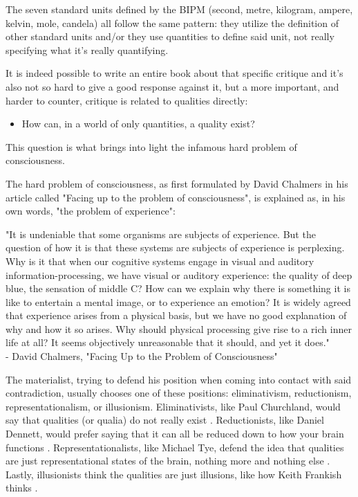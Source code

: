 The seven standard units defined by the BIPM (second, metre, kilogram, ampere, kelvin, mole,
candela) all follow the same pattern: they utilize the definition of other standard units
and/or they use quantities to define said unit, not really specifying what it's really
quantifying.

It is indeed possible to write an entire book about that specific critique and it's also not
so hard to give a good response against it, but a more important, and harder to counter,
critique is related to qualities directly:

\begin{itemize}
    \item How can, in a world of only quantities, a quality exist?
\end{itemize}

This question is what brings into light the infamous hard problem of
consciousness.

The hard problem of consciousness, as first formulated by David Chalmers in his article
called "Facing up to the problem of consciousness", is explained as, in his own words,
"the problem of experience":

\begin{center}
    \itshape
    \parbox{0.7\textwidth}{
    "It is undeniable that some organisms are subjects of experience. But the question of how
    it is that these systems are subjects of experience is perplexing. Why is it that when our
    cognitive systems engage in visual and auditory information-processing, we have visual or
    auditory experience: the quality of deep blue, the sensation of middle C? How can we explain
    why there is something it is like to entertain a mental image, or to experience an emotion? It
    is widely agreed that experience arises from a physical basis, but we have no good
    explanation of why and how it so arises. Why should physical processing give rise to a rich
    inner life at all? It seems objectively unreasonable that it should, and yet it does."\\
    \normalfont - David Chalmers, "Facing Up to the Problem of Consciousness" \cite{Chalmers1995}
    }
\end{center}

The materialist, trying to defend his position when coming into contact with said contradiction,
usually chooses one of these positions: eliminativism, reductionism, representationalism, or
illusionism. Eliminativists, like Paul Churchland, would say that qualities (or qualia) do not
really exist \cite{Churchland1981}. Reductionists, like Daniel Dennett, would prefer saying that
it can all be reduced down to how your brain functions \cite{Dennett1991}. Representationalists,
like Michael Tye, defend the idea that qualities are just representational states of the brain,
nothing more and nothing else \cite{Tye1997}. Lastly, illusionists think the qualities are just
illusions, like how Keith Frankish thinks \cite{Frankish2016}.

